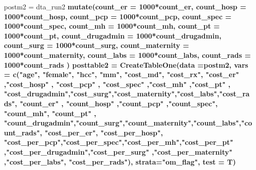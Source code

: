 \documentclass[]{article}
\newenvironment{Shaded}{\begin{snugshade}}{\end{snugshade}}
\newcommand{\KeywordTok}[1]{\textcolor[rgb]{0.13,0.29,0.53}{\textbf{#1}}}
\newcommand{\DataTypeTok}[1]{\textcolor[rgb]{0.13,0.29,0.53}{#1}}
\newcommand{\DecValTok}[1]{\textcolor[rgb]{0.00,0.00,0.81}{#1}}
\newcommand{\StringTok}[1]{\textcolor[rgb]{0.31,0.60,0.02}{#1}}
\newcommand{\OperatorTok}[1]{\textcolor[rgb]{0.81,0.36,0.00}{\textbf{#1}}}
\newcommand{\NormalTok}[1]{#1}
\begin{document}
\begin{Shaded}
\begin{Highlighting}[]
\NormalTok{postm2 =}\StringTok{ }\NormalTok{dta_run2 }\OperatorTok{%>%}
\StringTok{  }\KeywordTok{mutate}\NormalTok{(}\DataTypeTok{count_er =} \DecValTok{1000}\OperatorTok{*}\NormalTok{count_er,}
         \DataTypeTok{count_hosp =} \DecValTok{1000}\OperatorTok{*}\NormalTok{count_hosp,}
         \DataTypeTok{count_pcp =} \DecValTok{1000}\OperatorTok{*}\NormalTok{count_pcp,}
         \DataTypeTok{count_spec =} \DecValTok{1000}\OperatorTok{*}\NormalTok{count_spec,}
         \DataTypeTok{count_mh =} \DecValTok{1000}\OperatorTok{*}\NormalTok{count_mh,}
         \DataTypeTok{count_pt =} \DecValTok{1000}\OperatorTok{*}\NormalTok{count_pt,}
         \DataTypeTok{count_drugadmin =} \DecValTok{1000}\OperatorTok{*}\NormalTok{count_drugadmin,}
         \DataTypeTok{count_surg =} \DecValTok{1000}\OperatorTok{*}\NormalTok{count_surg,}
         \DataTypeTok{count_maternity =} \DecValTok{1000}\OperatorTok{*}\NormalTok{count_maternity,}
         \DataTypeTok{count_labs =} \DecValTok{1000}\OperatorTok{*}\NormalTok{count_labs,}
         \DataTypeTok{count_rads =} \DecValTok{1000}\OperatorTok{*}\NormalTok{count_rads}
\NormalTok{  )}
\NormalTok{posttable2 =}\StringTok{ }\KeywordTok{CreateTableOne}\NormalTok{(}\DataTypeTok{data =}\NormalTok{postm2, }\DataTypeTok{vars =} \KeywordTok{c}\NormalTok{(}\StringTok{"age"}\NormalTok{, }\StringTok{"female"}\NormalTok{, }\StringTok{"hcc"}\NormalTok{, }\StringTok{"mm"}\NormalTok{, }\StringTok{"cost_md"}\NormalTok{, }\StringTok{"cost_rx"}\NormalTok{, }\StringTok{"cost_er"}\NormalTok{ ,}\StringTok{"cost_hosp"}\NormalTok{ , }\StringTok{"cost_pcp"}\NormalTok{  , }\StringTok{"cost_spec"}\NormalTok{  ,}\StringTok{"cost_mh"}\NormalTok{ ,}\StringTok{"cost_pt"}\NormalTok{ ,  }\StringTok{"cost_drugadmin"}\NormalTok{,}\StringTok{"cost_surg"}\NormalTok{,}\StringTok{"cost_maternity"}\NormalTok{,}\StringTok{"cost_labs"}\NormalTok{,}\StringTok{"cost_rads"}\NormalTok{, }\StringTok{"count_er"}\NormalTok{  , }\StringTok{"count_hosp"}\NormalTok{ ,}\StringTok{"count_pcp"}\NormalTok{ ,}\StringTok{"count_spec"}\NormalTok{, }\StringTok{"count_mh"}\NormalTok{,   }\StringTok{"count_pt"}\NormalTok{  , }\StringTok{"count_drugadmin"}\NormalTok{,}\StringTok{"count_surg"}\NormalTok{,}\StringTok{"count_maternity"}\NormalTok{,}\StringTok{"count_labs"}\NormalTok{,}\StringTok{"count_rads"}\NormalTok{, }\StringTok{"cost_per_er"}\NormalTok{, }\StringTok{"cost_per_hosp"}\NormalTok{, }\StringTok{"cost_per_pcp"}\NormalTok{,}\StringTok{"cost_per_spec"}\NormalTok{,}\StringTok{"cost_per_mh"}\NormalTok{,}\StringTok{"cost_per_pt"}\NormalTok{ ,}\StringTok{"cost_per_drugadmin"}\NormalTok{,}\StringTok{"cost_per_surg"}\NormalTok{   ,}\StringTok{"cost_per_maternity"}\NormalTok{ ,}\StringTok{"cost_per_labs"}\NormalTok{, }\StringTok{"cost_per_rads"}\NormalTok{), }\DataTypeTok{strata=}\StringTok{"om_flag"}\NormalTok{, }\DataTypeTok{test =}\NormalTok{ T)}
}
\end{Highlighting}
\end{Shaded}
\end{document}
